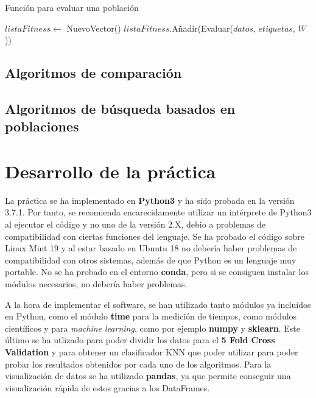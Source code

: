 \documentclass[11pt,a4paper]{article}
\begin{document}
\begin{algorithm}[H]
\caption{Función para evaluar una población}
\begin{algorithmic}[1]
\State $listaFitness \gets $ NuevoVector()
	\State $listaFitness$.Añadir(Evaluar($datos$, $etiquetas$, $W$))
\EndFor
\State {}
\EndFunction
\end{algorithmic}
\end{algorithm}

\subsection{Algoritmos de comparación}

\subsection{Algoritmos de búsqueda basados en poblaciones}

\newpage

\section{Desarrollo de la práctica}

La práctica se ha implementado en \textbf{Python3} y ha sido probada en la versión 3.7.1. Por tanto, se recomienda
encarecidamente utilizar un intérprete de Python3 al ejecutar el código y no uno de la versión 2.X, debio a problemas
de compatibilidad con ciertas funciones del lenguaje. Se ha probado el código sobre Linux Mint 19 y al estar basado en
Ubuntu 18 no debería haber problemas de compatibilidad con otros sistemas, además de que Python es un lenguaje muy portable.
No se ha probado en el entorno \textbf{conda}, pero si se consiguen instalar los módulos necesarios, no debería haber
problemas.

A la hora de implementar el software, se han utilizado tanto módulos ya incluidos en Python, como el módulo \textbf{time}
para la medición de tiempos, como módulos científicos y para \textit{machine learning}, como por ejemplo \textbf{numpy} y
\textbf{sklearn}. Este último se ha utlizado para poder dividir los datos para el \textbf{5 Fold Cross Validation}
y para obtener un clasificador KNN que poder utilizar para poder probar los resultados obtenidos por cada uno de los
algoritmos. Para la visualización de datos se ha utilizado \textbf{pandas}, ya que permite conseguir una visualización rápida
de estos gracias a los DataFrames.
\end{document}
